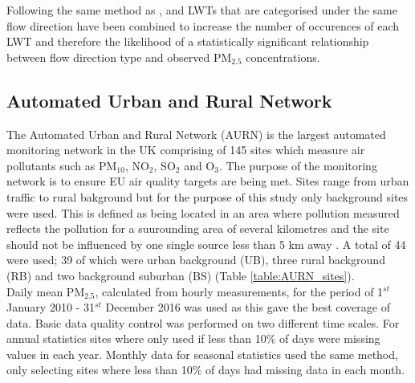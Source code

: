 \documentclass[10pt]{article}
\begin{document}
Following the same method as \cite{Pope2014}, \cite{OHare1995} and \cite{Tang2011} LWTs that are categorised under the same flow direction have been combined to increase the number of occurences of each LWT and therefore the likelihood of a statistically significant relationship between flow direction type and observed PM$_{2.5}$ concentrations. \\

\subsection*{Automated Urban and Rural Network}
The Automated Urban and Rural Network (AURN) is the largest automated monitoring network in the UK comprising of 145 sites which measure air pollutants such as PM$_{10}$, NO$_{2}$, SO$_{2}$ and O$_{3}$. The purpose of the monitoring network is to ensure EU air quality targets are being met. Sites range from urban traffic to rural bakground but for the purpose of this study only background sites were used. This is defined as being located in an area where pollution measured reflects the pollution for a suurounding area of several kilometres and the site should not be influenced by one single source less than 5 km away \cite{AURN_website}. A total of 44 were used; 39 of which were urban background (UB), three rural background (RB) and two background suburban (BS) (Table \ref{table:AURN_sites}). \\ 

Daily mean PM$_{2.5}$, calculated from hourly measurements, for the period of 1$^{st}$ January 2010 - 31$^{st}$ December 2016 was used as this gave the best coverage of data. Basic data quality control was performed on two different time scales. For annual statistics sites where only used if less than 10\% of days were  missing values in each year. Monthly data for seasonal statistics used the same method, only selecting sites where less than 10\% of days had missing data in each month. \\
\end{document}
